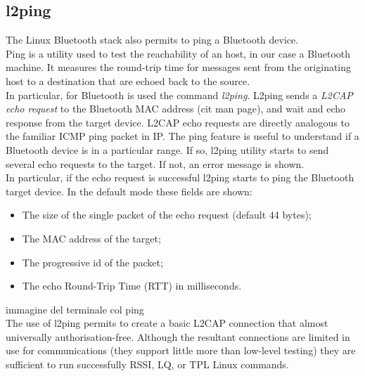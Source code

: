 \subsection{l2ping}
The Linux Bluetooth stack also permits to ping a Bluetooth device.\\
Ping is a utility used to test the reachability of an host, in our case a Bluetooth machine. It measures the round-trip time for messages sent from the originating host to a destination that are echoed back to the source.\\
\linebreak
In particular, for Bluetooth is used the command \textit{l2ping}. L2ping sends a \textit{L2CAP echo request} to the Bluetooth MAC address (cit man page), and wait and echo response from the target device. L2CAP echo requests are directly analogous to the familiar ICMP ping packet in IP.
The ping feature is useful to understand if a Bluetooth device is in a particular range. If so, l2ping utility starts to send several echo requests to the target. If not, an error message is shown.\\
In particular, if the echo request is successful l2ping starts to ping the Bluetooth target device. In the default mode these fields are shown:\\
\begin{itemize}
\item The size of the single packet of the echo request (default 44 bytes);
\item The MAC address of the target;
\item The progressive id of the packet;
\item The echo Round-Trip Time (RTT) in milliseconds.
\end{itemize}
immagine del terminale col ping\\
\linebreak
The use of l2ping permits to create a basic L2CAP connection that almost universally authorisation-free. Although the resultant connections are limited in use for communications (they support little more than low-level testing) they are sufficient to run successfully RSSI, LQ, or TPL Linux commands.

